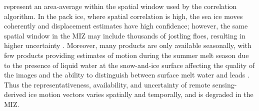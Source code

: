 \documentclass[review, jog]{igs}
\begin{document}
 represent an area-average within the spatial window used by the correlation algorithm.
In the pack ice, where spatial correlation is high, the sea ice moves coherently and displacement estimates have high confidence; however, the same spatial window in the MIZ may include thousands of jostling floes, resulting in higher uncertainty \citep{sumata2014_IntercomparisonArctic, gui2020_ValidationRemotesensing}. 
Moreover, many products are only available seasonally, with few products providing estimates of motion during the summer melt season due to the presence of liquid water at the snow-and-ice surface affecting the quality of the images and the ability to distinguish between surface melt water and leads \citep{lavergne2010_SeaIce, girard-ardhuin2012_EnhancedArctic}. 
Thus the representativeness, availability, and uncertainty of remote sensing-derived ice motion vectors varies spatially and temporally, and is degraded in the MIZ.
\end{document}
